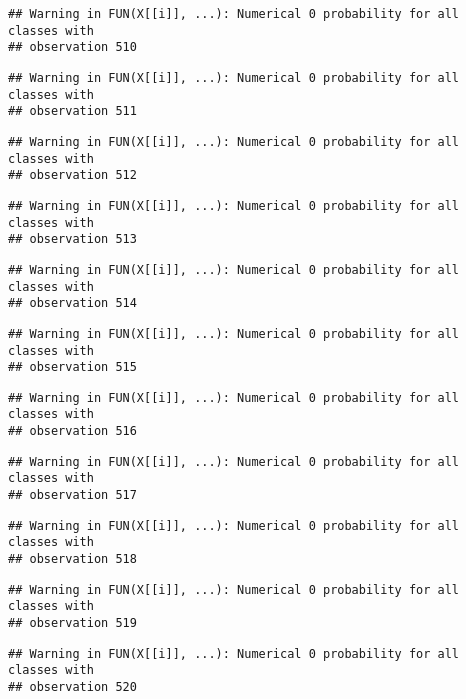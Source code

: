 \documentclass[
]{article}
\begin{document}
\begin{verbatim}
## Warning in FUN(X[[i]], ...): Numerical 0 probability for all classes with
## observation 510
\end{verbatim}

\begin{verbatim}
## Warning in FUN(X[[i]], ...): Numerical 0 probability for all classes with
## observation 511
\end{verbatim}

\begin{verbatim}
## Warning in FUN(X[[i]], ...): Numerical 0 probability for all classes with
## observation 512
\end{verbatim}

\begin{verbatim}
## Warning in FUN(X[[i]], ...): Numerical 0 probability for all classes with
## observation 513
\end{verbatim}

\begin{verbatim}
## Warning in FUN(X[[i]], ...): Numerical 0 probability for all classes with
## observation 514
\end{verbatim}

\begin{verbatim}
## Warning in FUN(X[[i]], ...): Numerical 0 probability for all classes with
## observation 515
\end{verbatim}

\begin{verbatim}
## Warning in FUN(X[[i]], ...): Numerical 0 probability for all classes with
## observation 516
\end{verbatim}

\begin{verbatim}
## Warning in FUN(X[[i]], ...): Numerical 0 probability for all classes with
## observation 517
\end{verbatim}

\begin{verbatim}
## Warning in FUN(X[[i]], ...): Numerical 0 probability for all classes with
## observation 518
\end{verbatim}

\begin{verbatim}
## Warning in FUN(X[[i]], ...): Numerical 0 probability for all classes with
## observation 519
\end{verbatim}

\begin{verbatim}
## Warning in FUN(X[[i]], ...): Numerical 0 probability for all classes with
## observation 520
\end{verbatim}
\end{document}
